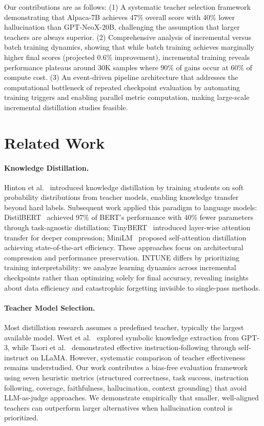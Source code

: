 \documentclass[sigconf]{acmart}
\begin{document}
Our contributions are as follows: (1) A systematic teacher selection framework demonstrating that Alpaca-7B achieves 47\% overall score with 40\% lower hallucination than GPT-NeoX-20B, challenging the assumption that larger teachers are always superior. (2) Comprehensive analysis of incremental versus batch training dynamics, showing that while batch training achieves marginally higher final scores (projected 0.6\% improvement), incremental training reveals performance plateaus around 30K samples where 90\% of gains occur at 60\% of compute cost. (3) An event-driven pipeline architecture that addresses the computational bottleneck of repeated checkpoint evaluation by automating training triggers and enabling parallel metric computation, making large-scale incremental distillation studies feasible.

\section{Related Work}

\paragraph{Knowledge Distillation.}
Hinton et al.~\cite{hinton2015distilling} introduced knowledge distillation by training students on soft probability distributions from teacher models, enabling knowledge transfer beyond hard labels. Subsequent work applied this paradigm to language models: DistilBERT~\cite{sanh2019distilbert} achieved 97\% of BERT's performance with 40\% fewer parameters through task-agnostic distillation; TinyBERT~\cite{jiao2020tinybert} introduced layer-wise attention transfer for deeper compression; MiniLM~\cite{wang2020minilm} proposed self-attention distillation achieving state-of-the-art efficiency. These approaches focus on architectural compression and performance preservation. INTUNE differs by prioritizing training interpretability: we analyze learning dynamics across incremental checkpoints rather than optimizing solely for final accuracy, revealing insights about data efficiency and catastrophic forgetting invisible to single-pass methods.

\paragraph{Teacher Model Selection.}
Most distillation research assumes a predefined teacher, typically the largest available model. West et al.~\cite{west2022symbolic} explored symbolic knowledge extraction from GPT-3, while Taori et al.~\cite{taori2023alpaca} demonstrated effective instruction-following through self-instruct on LLaMA. However, systematic comparison of teacher effectiveness remains understudied. Our work contributes a bias-free evaluation framework using seven heuristic metrics (structured correctness, task success, instruction following, coverage, faithfulness, hallucination, context grounding) that avoid LLM-as-judge approaches. We demonstrate empirically that smaller, well-aligned teachers can outperform larger alternatives when hallucination control is prioritized.
\end{document}
